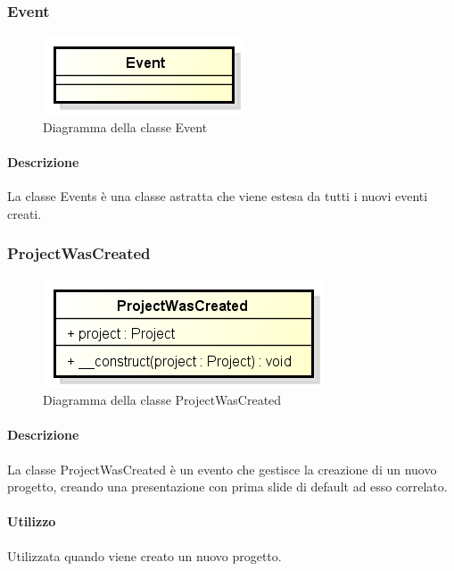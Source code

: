 \subsubsection{Event}
\begin{figure}[h]
	\centering
	\includegraphics[width=0.5\linewidth]{img/premi_back_end_event}
	\caption[Diagramma della classe Event]{Diagramma della classe Event}
	\label{fig:premi_back_end_event}
\end{figure}


\paragraph{Descrizione}
La classe Events è una classe astratta che viene estesa da tutti i nuovi eventi creati.

\subsubsection{ProjectWasCreated}
\begin{figure}[h]
	\centering
	\includegraphics[width=0.5\linewidth]{img/premi_back_end_project_was_created}
	\caption[Diagramma della classe ProjectWasCreated]{Diagramma della classe ProjectWasCreated}
	\label{fig:premi_back_end_project_was_created}
\end{figure}


\paragraph{Descrizione}
La classe ProjectWasCreated è un evento che gestisce la creazione di un nuovo progetto, creando una presentazione con prima slide di default ad esso correlato.

\paragraph{Utilizzo}
Utilizzata quando viene creato un nuovo progetto.

